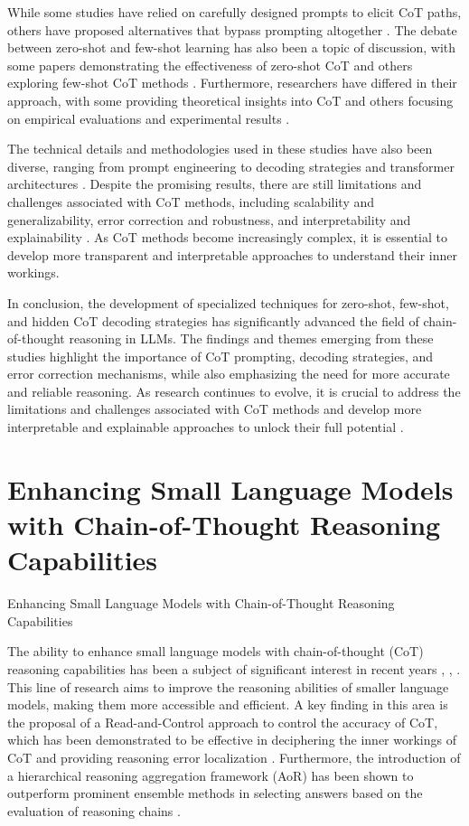 \documentclass[conference]{IEEEtran}
\begin{document}
While some studies have relied on carefully designed prompts to elicit CoT paths, others have proposed alternatives that bypass prompting altogether \cite{b9}. The debate between zero-shot and few-shot learning has also been a topic of discussion, with some papers demonstrating the effectiveness of zero-shot CoT and others exploring few-shot CoT methods \cite{b10}. Furthermore, researchers have differed in their approach, with some providing theoretical insights into CoT and others focusing on empirical evaluations and experimental results \cite{b11}.

The technical details and methodologies used in these studies have also been diverse, ranging from prompt engineering to decoding strategies and transformer architectures \cite{b12}. Despite the promising results, there are still limitations and challenges associated with CoT methods, including scalability and generalizability, error correction and robustness, and interpretability and explainability \cite{b13}. As CoT methods become increasingly complex, it is essential to develop more transparent and interpretable approaches to understand their inner workings.

In conclusion, the development of specialized techniques for zero-shot, few-shot, and hidden CoT decoding strategies has significantly advanced the field of chain-of-thought reasoning in LLMs. The findings and themes emerging from these studies highlight the importance of CoT prompting, decoding strategies, and error correction mechanisms, while also emphasizing the need for more accurate and reliable reasoning. As research continues to evolve, it is crucial to address the limitations and challenges associated with CoT methods and develop more interpretable and explainable approaches to unlock their full potential \cite{b14}.

\section{Enhancing Small Language Models with Chain-of-Thought Reasoning Capabilities}
Enhancing Small Language Models with Chain-of-Thought Reasoning Capabilities

The ability to enhance small language models with chain-of-thought (CoT) reasoning capabilities has been a subject of significant interest in recent years \cite{b1}, \cite{b2}, \cite{b3}. This line of research aims to improve the reasoning abilities of smaller language models, making them more accessible and efficient. A key finding in this area is the proposal of a Read-and-Control approach to control the accuracy of CoT, which has been demonstrated to be effective in deciphering the inner workings of CoT and providing reasoning error localization \cite{b4}. Furthermore, the introduction of a hierarchical reasoning aggregation framework (AoR) has been shown to outperform prominent ensemble methods in selecting answers based on the evaluation of reasoning chains \cite{b5}.
\end{document}

